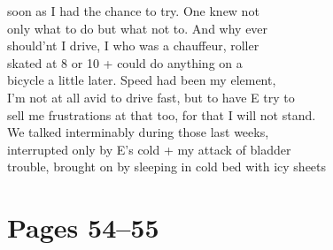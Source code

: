 \documentclass[11pt,a4paper]{article}
\begin{document}
{soon as I had the chance to try. One knew not \\
only what to do but what not to. And why ever \\
should'nt I drive, I who was a chauffeur, roller \\
skated at 8 or 10 + could do anything on a \\
bicycle a little later. Speed had been my element, \\
I'm not at all avid to drive fast, but to have E try to \\
sell me frustrations at that too, for that I will not stand. \\
\quad We talked interminably during those last weeks, \\
interrupted only by E's cold + my attack of bladder \\
trouble, brought on by sleeping in cold bed with icy sheets}




\section{Pages 54--55}

\end{document}
